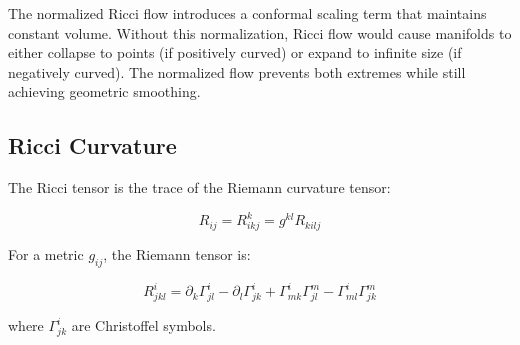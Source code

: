 \documentclass[12pt,a4paper]{article}
\begin{document}
The normalized Ricci flow introduces a conformal scaling term that maintains constant volume. Without this normalization, Ricci flow would cause manifolds to either collapse to points (if positively curved) or expand to infinite size (if negatively curved). The normalized flow prevents both extremes while still achieving geometric smoothing.

\subsection{Ricci Curvature}

The Ricci tensor is the trace of the Riemann curvature tensor:

\begin{equation}
R_{ij} = R^k_{ikj} = g^{kl} R_{kilj}
\end{equation}

For a metric $g_{ij}$, the Riemann tensor is:

\begin{equation}
R^i_{jkl} = \partial_k \Gamma^i_{jl} - \partial_l \Gamma^i_{jk} 
          + \Gamma^i_{mk} \Gamma^m_{jl} - \Gamma^i_{ml} \Gamma^m_{jk}
\end{equation}

where $\Gamma^i_{jk}$ are Christoffel symbols.
\end{document}
